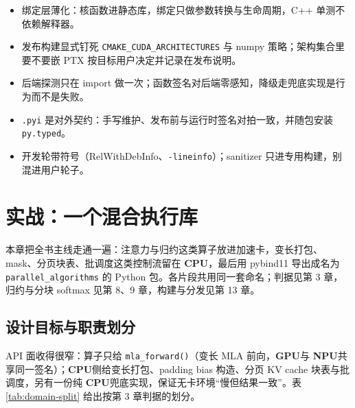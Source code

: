 \documentclass[12pt,a4paper,fontset=fandol]{ctexbook}
\newcommand{\Fn}[1]{\texttt{#1()}}
\newcommand{\Tp}[1]{\texttt{#1}}
\newcommand{\Dom}[1]{\textsf{\bfseries #1}}
\newcommand{\CPU}{\Dom{CPU}}
\newcommand{\GPU}{\Dom{GPU}}
\newcommand{\NPU}{\Dom{NPU}}
\begin{document}
\begin{bestpractice}[title={构建与分发纪律}]
\begin{itemize}
\item 绑定层薄化：核函数进静态库，绑定只做参数转换与生命周期，C++ 单测不依赖解释器。
\item 发布构建显式钉死 \Tp{CMAKE\_CUDA\_ARCHITECTURES} 与 numpy 策略；架构集合里要不要嵌 PTX 按目标用户决定并记录在发布说明。
\item 后端探测只在 import 做一次；函数签名对后端零感知，降级走兜底实现是行为而不是失败。
\item \Tp{.pyi} 是对外契约：手写维护、发布前与运行时签名对拍一致，并随包安装 \Tp{py.typed}。
\item 开发轮带符号（RelWithDebInfo、\Tp{-lineinfo}）；sanitizer 只进专用构建，别混进用户轮子。
\end{itemize}
\end{bestpractice}
\chapter{实战：一个混合执行库}

本章把全书主线走通一遍：注意力与归约这类算子放进加速卡，变长打包、mask、分页块表、批调度这类控制流留在 \CPU{}，最后用 pybind11 导出成名为 \Tp{parallel\_algorithms} 的 Python 包。各片段共用同一套命名；判据见第 3 章，归约与分块 softmax 见第 8、9 章，构建与分发见第 13 章。

\section{设计目标与职责划分}

API 面收得很窄：算子只给 \Fn{mla\_forward}（变长 MLA 前向，\GPU{}与 \NPU{}共享同一签名）；\CPU{}侧给变长打包、padding bias 构造、分页 KV cache 块表与批调度，另有一份纯 \CPU{}兜底实现，保证无卡环境``慢但结果一致''。表 \ref{tab:domain-split} 给出按第 3 章判据的划分。
\end{document}
